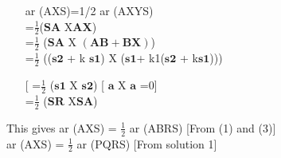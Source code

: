 \documentclass{article}
\begin{document}
\begin{multicols}{2}
\begin{enumerate}
\item[]ar (AXS)=1/2 ar (AXYS)\\
    \hspace{1.5cm}    =$\frac{1}{2}$($\boldsymbol{SA}$ X$\boldsymbol{AX}$)\\
    \hspace{1.5cm}    =$\frac{1}{2}$ ($\boldsymbol{SA}$ X $\boldsymbol{(AB+BX)}$)\\
    \hspace{1.5cm}    =$\frac{1}{2}$ (($\boldsymbol{s2}$ + k $\boldsymbol{s1}$) X ($\boldsymbol{s1}$+ k1($\boldsymbol{s2}$ + k$\boldsymbol{s1}$)))
\item[[] =$\frac{1}{2}$ ($\boldsymbol{s1}$ X $\boldsymbol{s2}$)           [ $\boldsymbol{a}$ X $\boldsymbol{a}$ =0] \\
       =$\frac{1}{2}$ ($\boldsymbol{SR}$ X$\boldsymbol{SA}$)     
\end{enumerate}
\begin{flushleft}
This gives ar (AXS) = $\frac{1}{2}$ ar (ABRS) [From (1) and (3)]\\
           ar (AXS) = $\frac{1}{2}$ ar (PQRS) [From solution 1] \\
\end{flushleft}

\end{multicols}
\end{document}

